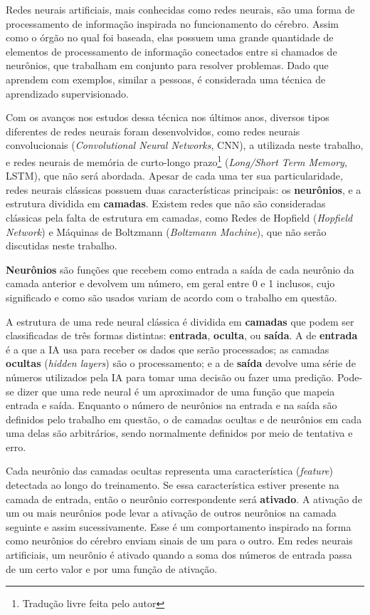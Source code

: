 
Redes neurais artificiais, mais conhecidas como redes neurais, são uma forma de processamento de informação inspirada no funcionamento do cérebro.
Assim como o órgão no qual foi baseada, elas possuem uma grande quantidade de elementos de processamento de informação conectados entre si chamados de neurônios, que trabalham em conjunto para resolver problemas.
Dado que aprendem com exemplos, similar a pessoas, é considerada uma técnica de aprendizado supervisionado.

Com os avanços nos estudos dessa técnica nos últimos anos, diversos tipos diferentes de redes neurais foram desenvolvidos, como redes neurais convolucionais (\textit{Convolutional Neural Networks}, CNN), a utilizada neste trabalho, e redes neurais de memória de curto-longo prazo\footnote{Tradução livre feita pelo autor} (\textit{Long/Short Term Memory}, LSTM), que não será abordada.
Apesar de cada uma ter sua particularidade, redes neurais clássicas possuem duas características principais: os \textbf{neurônios}, e a estrutura dividida em \textbf{camadas}.
Existem redes que não são consideradas clássicas pela falta de estrutura em camadas, como Redes de Hopfield (\textit{Hopfield Network}) e Máquinas de Boltzmann (\textit{Boltzmann Machine}), que não serão discutidas neste trabalho.

\textbf{Neurônios} são funções que recebem como entrada a saída de cada neurônio da camada anterior e devolvem um número, em geral entre 0 e 1 inclusos, cujo significado e como são usados variam de acordo com o trabalho em questão.

A estrutura de uma rede neural clássica é dividida em \textbf{camadas} que podem ser classificadas de três formas distintas: \textbf{entrada}, \textbf{oculta}, ou \textbf{saída}.
A de \textbf{entrada} é a que a IA usa para receber os dados que serão processados;
as camadas \textbf{ocultas} (\textit{hidden layers}) são o processamento;
e a de \textbf{saída} devolve uma série de números utilizados pela IA para tomar uma decisão ou fazer uma predição.
Pode-se dizer que uma rede neural é um aproximador de uma função que mapeia entrada e saída.
Enquanto o número de neurônios na entrada e na saída são definidos pelo trabalho em questão, o de camadas ocultas e de neurônios em cada uma delas são arbitrários, sendo normalmente definidos por meio de tentativa e erro.

Cada neurônio das camadas ocultas representa uma característica (\textit{feature}) detectada ao longo do treinamento.
Se essa característica estiver presente na camada de entrada, então o neurônio correspondente será \textbf{ativado}.
A ativação de um ou mais neurônios pode levar a ativação de outros neurônios na camada seguinte e assim sucessivamente. Esse é um comportamento inspirado na forma como neurônios do cérebro enviam sinais de um para o outro.
Em redes neurais artificiais, um neurônio é ativado quando a soma dos números de entrada passa de um certo valor e por uma função de ativação.

